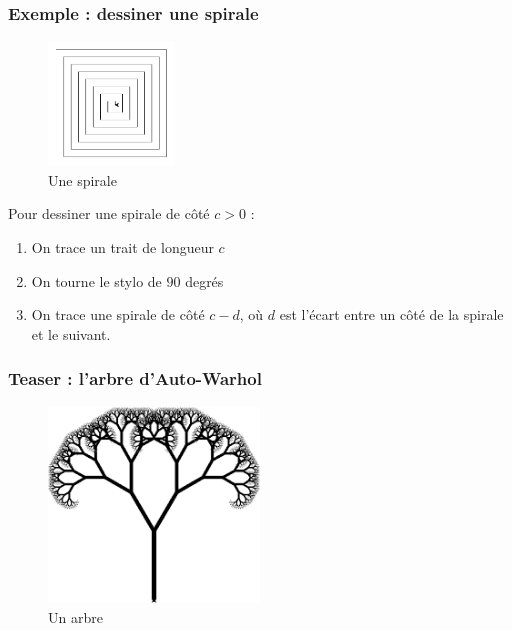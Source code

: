 \documentclass[x11names,svgnames]{beamer}
\begin{document}
\begin{frame}
  \frametitle{Exemple : dessiner une spirale}

  \begin{figure}[ht]
    \centering
    \includegraphics[width=0.3\textwidth]{fig/spirale.png}
    \caption{Une spirale}
    \label{fig:spirale}
  \end{figure}

  Pour dessiner une spirale de côté $c > 0$ :
  \begin{enumerate}
  \item On trace un trait de longueur $c$
  \item On tourne le stylo de $90$ degrés
  \item On trace une spirale de côté $c-d$, où $d$ est l'écart entre un côté de la spirale et le suivant.
  \end{enumerate}
  
\end{frame}

\begin{frame}
  \frametitle{Teaser : l'arbre d'Auto-Warhol}

  \begin{figure}[ht]
    \centering
    \includegraphics[width=0.5\textwidth]{fig/arbre.png}
    \caption{Un arbre}
    \label{fig:arbre}
  \end{figure}

\end{frame}
\end{document}
